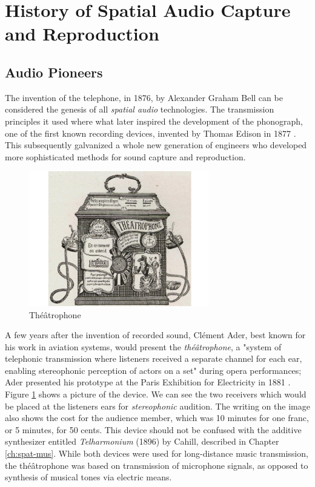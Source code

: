 \section{History of Spatial Audio Capture and Reproduction}

\subsection{Audio Pioneers} \label{subsec:audio_pioneers}

The invention of the telephone, in 1876, by Alexander Graham Bell \cite{grosvenor2016alexander} can be considered the genesis of all \textit{spatial audio} technologies. The transmission principles it used where what later inspired the development of the phonograph, one of the first known recording devices, invented by Thomas Edison in 1877 \cite{gitelman1999scripts}. This subsequently galvanized a whole new generation of engineers who developed more sophisticated methods for sound capture and reproduction. 

\begin{figure}[ht]%
\centering
\includegraphics[width=0.7\textwidth]{img/theatrophone.jpeg} 
\caption{Théâtrophone \cite{theatrophonepic}}
\label{fig:theatrophone}
\end{figure}

A few years after the invention of recorded sound, Clément Ader, best known for his work in aviation systems, would present the \textit{théâtrophone}, a "system of telephonic transmission where listeners received a separate channel for each ear, enabling stereophonic perception of actors on a set" during opera performances; Ader presented his prototype at the Paris Exhibition for Electricity in 1881 \cite{malham19953}. Figure \ref{fig:theatrophone} shows a picture of the device. We can see the two receivers which would be placed at the listeners ears for \textit{stereophonic} audition. The writing on the image also shows the cost for the audience member, which was 10 minutes for one franc, or 5 minutes, for 50 cents. This device should not be confused with the additive synthesizer entitled \textit{Telharmonium} (1896) by Cahill, described in Chapter \ref{ch:spat-mus}. While both devices were used for long-distance music transmission, the théâtrophone was based on transmission of microphone signals, as opposed to synthesis of musical tones via electric means. 

